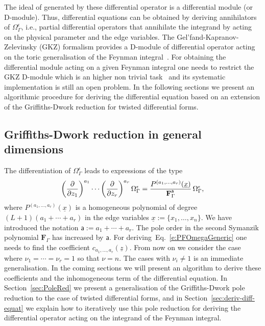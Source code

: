\documentclass[a4paper,12pt]{article}
\numberwithin{equation}{section}
\numberwithin{figure}{section}
\begin{document}
The ideal of generated by these
differential operator is a differential module (or D-module).  Thus,
differential equations can be obtained by deriving  annihilators  of
$\Omega_\Gamma^\epsilon$, i.e., partial differential operators that
annihilate  the integrand by acting on the physical parameter and the
edge variables.   The Gel'fand-Kapranov-Zelevinsky (GKZ) formalism provides
a D-module of differential operator acting on the toric generalisation
of the Feynman
integral~\cite{Vanhove:2018mto,delaCruz:2019skx,Klausen:2019hrg,Feng:2019bdx,Klemm:2019dbm,Ananthanarayan:2022ntm,Agostini:2022cgv,
  Munch:2022ouq}.  For obtaining the differential module acting on a
given Feynman integral one needs to restrict the GKZ  D-module which
is an higher non trivial task~\cite{delaCruz:2019skx,Chestnov:2023kww} and its systematic implementation is
still an open problem. In the following sections we present an
algorithmic procedure for deriving the differential equation based on
an extension of the Griffiths-Dwork reduction for twisted differential forms.


\subsection{Griffiths-Dwork reduction in general dimensions}\label{sec:griff-dwork-reduct}
The    differentiation of $\Omega_\Gamma^\epsilon$ 
leads  to  expressions of the type 
\begin{equation}\label{e:PDE}
\left(\partial\over \partial z_1\right)^{a_1}\cdots\left(\partial
  \over\partial z_r\right)^{a_r} \Omega_\Gamma^\epsilon=
{  P^{(a_1,\dots,a_r)}(\underline x)\over \textbf{F}_\Gamma^{\mathsf {a}}}\, \Omega_\Gamma^\epsilon,
\end{equation}
where 
$  P^{(a_1,\dots,a_r)}(\underline x)$ is a
  homogeneous polynomial of degree $(L+1)(a_1+\cdots+a_r)$ in
 the edge variables $\underline x:=\{x_1,\dots, x_n\}$.
 We have introduced the notation $\mathsf{a}:=a_1+\cdots +a_r$. 
The
  pole order in the second Symanzik polynomial $\textbf{F}_\Gamma$ has increased by
  $\mathsf a$. 
  For deriving~Eq.~\eqref{e:PFOmegaGeneric} one needs to find the
  coefficient $c_{a_1,\dots, a_r}(\underline z)$.  From now on we consider the case where
  $\nu_1=\cdots=\nu_r=1$ so that $\nu=n$. The cases with $\nu_i\neq1$
  is an immediate generalisation. 
  In the coming sections we will present an algorithm to derive these
  coefficients and the inhomogeneous term of the differential
  equation. In Section~\ref{sec:PoleRed} we present a generalisation of the Griffiths-Dwork
  pole reduction to the case of twisted differential forms, and in
  Section~\ref{sec:deriv-diff-equat} we explain how to iteratively use this pole reduction for
  deriving the differential operator acting on the integrand of the
  Feynman integral.
\end{document}
